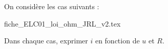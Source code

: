
\finEntrainement























\newpage
{}




\hauteurLargeurCadreReponse		{7mm}{40mm}
\initialisationEntrainement

On considère les cas suivants : 

\begin{center}
{fiche_ELC01_loi_ohm_JRL_v2.tex}
\end{center}

Dans chaque cas, exprimer $i$ en fonction de $u$ et $R$.

\smallskip

\debutEntrainement


